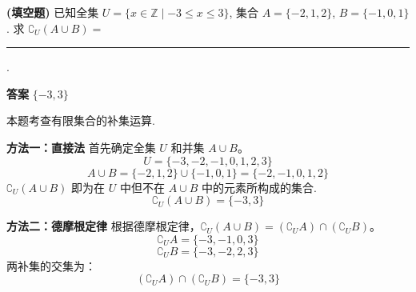 \begin{prob}[topic={集合的并集与补集运算}, score=5]
\textbf{(填空题)} 已知全集 $U=\{x \in \mathbb{Z} \mid -3 \le x \le 3\}$, 集合 $A=\{-2, 1, 2\}$, $B=\{-1, 0, 1\}$. 求 $\complement_U(A \cup B) = $ \rule{3cm}{0.5pt}.
\end{prob}
\begin{prob-sol}
\textbf{答案} $\{-3, 3\}$

本题考查有限集合的补集运算.

\textbf{方法一：直接法}
首先确定全集 $U$ 和并集 $A \cup B$。
\[ U = \{-3, -2, -1, 0, 1, 2, 3\} \]
\[ A \cup B = \{-2, 1, 2\} \cup \{-1, 0, 1\} = \{-2, -1, 0, 1, 2\} \]
$\complement_U(A \cup B)$ 即为在 $U$ 中但不在 $A \cup B$ 中的元素所构成的集合.
\[ \complement_U(A \cup B) = \{-3, 3\} \]

\textbf{方法二：德摩根定律}
根据德摩根定律，$\complement_U(A \cup B) = (\complement_U A) \cap (\complement_U B)$。
\[ \complement_U A = \{-3, -1, 0, 3\} \]
\[ \complement_U B = \{-3, -2, 2, 3\} \]
两补集的交集为：
\[ (\complement_U A) \cap (\complement_U B) = \{-3, 3\} \]
\end{prob-sol}
